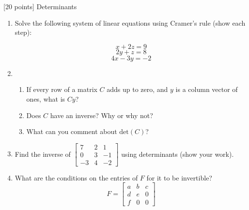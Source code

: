 [20 points] Determinants\\

\vspace{0.1in}

\begin{enumerate}

    \item Solve the following system of linear equations using Cramer's rule (show each step):

    \[x + 2z = 9\]
    \[2y + z =8\]
    \[4x - 3y = -2\]

    \item \begin{enumerate}
        \item If every row of a matrix \(C\) adds up to zero, and \(y\) is a column vector of ones, what is \(Cy\)? 
        \item Does \(C\) have an inverse? Why or why not? 
        \item What can you comment about \(\text{det}(C)\)?
        \end{enumerate}
        
    \item Find the inverse of \(\begin{bmatrix}
    7 & 2 & 1\\
    0 & 3 & -1\\
    -3 & 4 & -2
    \end{bmatrix}\) using determinants (show your work).\\
    
    \item What are the conditions on the entries of \(F\) for it to be invertible?\\

    \[F = \begin{bmatrix}
    a & b & c\\
    d & e & 0\\
    f & 0 & 0
    \end{bmatrix}\]

    
\end{enumerate}